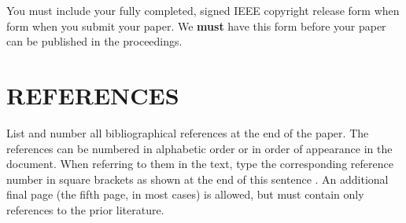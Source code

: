 \documentclass{article}
\begin{document}
You must include your fully completed, signed IEEE copyright release form when
form when you submit your paper. We {\bf must} have this form before your paper
can be published in the proceedings.

\section{REFERENCES}
\label{sec:ref}

List and number all bibliographical references at the end of the
paper. The references can be numbered in alphabetic order or in
order of appearance in the document. When referring to them in
the text, type the corresponding reference number in square
brackets as shown at the end of this sentence \cite{C2}. An
additional final page (the fifth page, in most cases) is
allowed, but must contain only references to the prior
literature.



\end{document}
